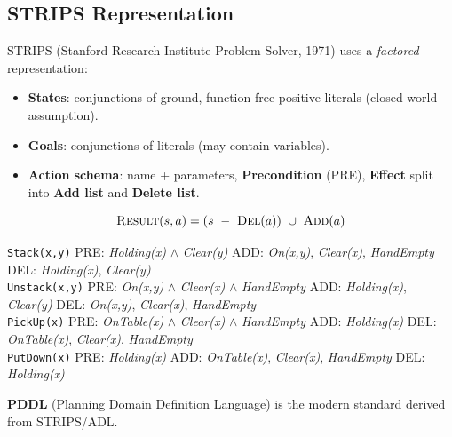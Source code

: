 \subsection{STRIPS Representation}
STRIPS (Stanford Research Institute Problem Solver, 1971) uses a \emph{factored} representation:
\begin{itemize}
\item \textbf{States}: conjunctions of ground, function-free positive literals (closed-world assumption).
\item \textbf{Goals}: conjunctions of literals (may contain variables).
\item \textbf{Action schema}: name + parameters, \textbf{Precondition} (PRE), \textbf{Effect} split into \textbf{Add list} and \textbf{Delete list}.
\end{itemize}
\[\textsc{Result}(s,a)=(s\ -\ \textsc{Del}(a))\ \cup\ \textsc{Add}(a)\]
\begin{example}
\small
\texttt{Stack(x,y)} \quad PRE: \textit{Holding(x)} $\wedge$ \textit{Clear(y)} \quad ADD: \textit{On(x,y)}, \textit{Clear(x)}, \textit{HandEmpty} \quad DEL: \textit{Holding(x)}, \textit{Clear(y)}\\
\texttt{Unstack(x,y)} \quad PRE: \textit{On(x,y)} $\wedge$ \textit{Clear(x)} $\wedge$ \textit{HandEmpty} \quad ADD: \textit{Holding(x)}, \textit{Clear(y)} \quad DEL: \textit{On(x,y)}, \textit{Clear(x)}, \textit{HandEmpty}\\
\texttt{PickUp(x)} \quad PRE: \textit{OnTable(x)} $\wedge$ \textit{Clear(x)} $\wedge$ \textit{HandEmpty} \quad ADD: \textit{Holding(x)} \quad DEL: \textit{OnTable(x)}, \textit{Clear(x)}, \textit{HandEmpty}\\
\texttt{PutDown(x)} \quad PRE: \textit{Holding(x)} \quad ADD: \textit{OnTable(x)}, \textit{Clear(x)}, \textit{HandEmpty} \quad DEL: \textit{Holding(x)}\\[3pt]
\end{example}
\textbf{PDDL} (Planning Domain Definition Language) is the modern standard derived from STRIPS/ADL.

